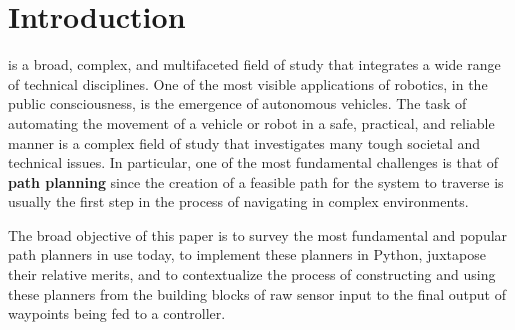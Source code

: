 \section{Introduction}

 is a broad, complex, and multifaceted field of study that integrates a wide range of technical disciplines. One of the most visible applications of robotics, in the public consciousness, is the emergence of autonomous vehicles. The task of automating the movement of a vehicle or robot in a safe, practical, and reliable manner is a complex field of study that investigates many tough societal and technical issues. In particular, one of the most fundamental challenges is that of \textbf{path planning} since the creation of a feasible path for the system to traverse is usually the first step in the process of navigating in complex environments.

The broad objective of this paper is to survey the most fundamental and popular path planners in use today, to implement these planners in Python, juxtapose their relative merits, and to contextualize the process of constructing and using these planners from the building blocks of raw sensor input to the final output of waypoints being fed to a controller.   
